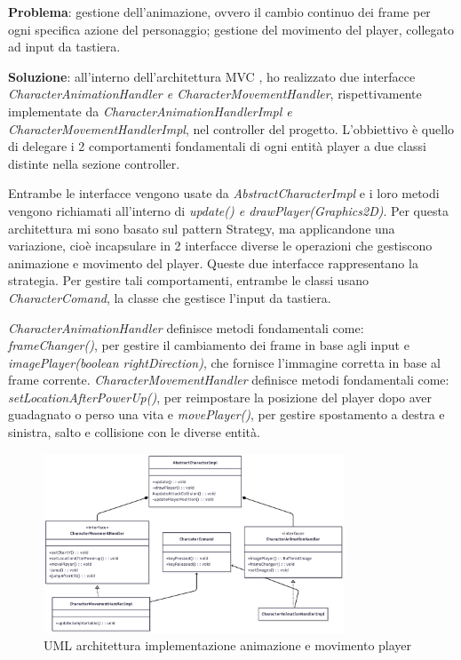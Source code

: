 \documentclass[a4paper,12pt]{report}
\begin{document}
\textbf{Problema}: gestione dell'animazione, ovvero il cambio continuo dei frame per ogni specifica azione del personaggio; 
gestione del movimento del player, collegato ad input da tastiera.\vspace{1cm}

\textbf{Soluzione}: all'interno dell'architettura MVC , ho realizzato due interfacce \emph{CharacterAnimationHandler e 
CharacterMovementHandler}, rispettivamente implementate da \emph{CharacterAnimationHandlerImpl e CharacterMovementHandlerImpl}, nel controller 
del progetto. L'obbiettivo è quello di delegare i 2 comportamenti fondamentali di ogni entità player a due classi distinte nella sezione 
controller.

Entrambe le interfacce vengono usate da \emph{AbstractCharacterImpl} e i loro metodi vengono richiamati all'interno di \emph{update() 
e drawPlayer(Graphics2D)}.
Per questa architettura mi sono basato sul pattern Strategy, ma applicandone una variazione, cioè incapsulare in 2 interfacce diverse 
le operazioni che gestiscono animazione e movimento del player. Queste due interfacce rappresentano la strategia. Per gestire 
tali comportamenti, entrambe le classi usano \emph{CharacterComand}, la classe che gestisce l'input da tastiera.

\emph{CharacterAnimationHandler} definisce metodi fondamentali come: \emph{frameChanger()}, per gestire il cambiamento dei frame in base agli input 
e \emph{imagePlayer(boolean rightDirection)}, che fornisce l'immagine corretta in base al frame corrente.
\emph{CharacterMovementHandler} definisce metodi fondamentali come: \emph{setLocationAfterPowerUp()}, per reimpostare la posizione del player
dopo aver guadagnato o perso una vita e \emph{movePlayer()}, per gestire spostamento a destra e sinistra, salto e collisione con le diverse 
entità.

\begin{figure}[H]
    \centering
    \includegraphics[width=0.8\textwidth]{resources/playerAction.png}
    \caption{UML architettura implementazione animazione e movimento player}
    \label{fig:2.2}
\end{figure}
\end{document}
